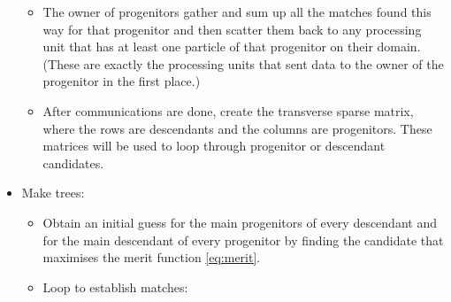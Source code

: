\begin{appendices}
\begin{itemize}
\begin{itemize}
		
		\item The owner of progenitors gather and sum up all the matches found this way for that progenitor and then scatter them back to any processing unit that has at least one particle of that progenitor on their domain.
		(These are exactly the processing units that sent data to the owner of the progenitor in the first place.)
		
		\item After communications are done, create the transverse sparse matrix, where the rows are descendants and the columns are progenitors.
		These matrices will be used to loop through progenitor or descendant candidates.
		
	\end{itemize}
	
	\item Make trees:
	
	\begin{itemize}
		
		\item Obtain an initial guess for the main progenitors of every descendant and for the main descendant of every progenitor by finding the candidate that maximises the merit function \eqref{eq:merit}.
		
%		
		
		\item Loop to establish matches:
		

\end{itemize}
\end{itemize}
\end{appendices}
